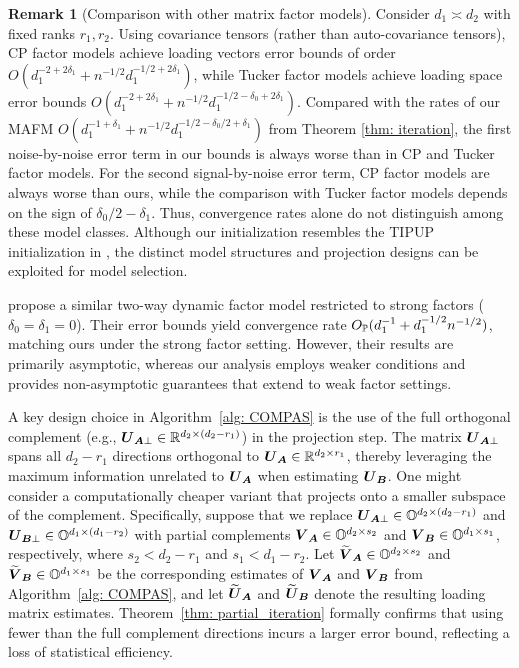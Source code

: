 \documentclass[11pt,letterpaper]{article}
\theoremstyle{definition}
\newtheorem{remark}{Remark}
\newcommand{\cano}[1]{\widetilde{\mathbf{#1}}}
\begin{document}
\begin{remark}[Comparison with other matrix factor models] \label{rmk:comparison}
Consider $d_1\asymp d_2$ with fixed ranks $r_1,r_2$. Using covariance tensors (rather than auto-covariance tensors), CP factor models \citep{han2024cp,chen2026estimation} achieve loading vectors error bounds of order $O(d_1^{-2+2\delta_1}+n^{-1/2}d_1^{-1/2+2\delta_1})$, while Tucker factor models \citep{han2024tensor} achieve loading space error bounds $O(d_1^{-2+2\delta_1}+n^{-1/2}d_1^{-1/2-\delta_0+2\delta_1})$. Compared with the rates of our MAFM $O(d_1^{-1+\delta_1}+n^{-1/2}d_1^{-1/2-\delta_0/2+\delta_1})$ from Theorem \ref{thm: iteration}, the first noise-by-noise error term in our bounds is always worse than in CP and Tucker factor models. For the second signal-by-noise error term, CP factor models are always worse than ours, while the comparison with Tucker factor models depends on the sign of $\delta_0/2-\delta_1$. Thus, convergence rates alone do not distinguish among these model classes. Although our initialization resembles the TIPUP initialization in \cite{chen2022factor, han2024tensor}, the distinct model structures and projection designs can be exploited for model selection.

\cite{yuan2023twoway} propose a similar two-way dynamic factor model restricted to strong factors ($\delta_0=\delta_1=0$). Their error bounds yield convergence rate $O_{\mathbb{P}}(d_1^{-1}+d_1^{-1/2} n^{-1/2})$, matching ours under the strong factor setting. However, their results are primarily asymptotic, whereas our analysis employs weaker conditions and provides non-asymptotic guarantees that extend to weak factor settings.



\end{remark}




A key design choice in Algorithm~\ref{alg: COMPAS} is the use of the full orthogonal complement (e.g., $\boldsymbol{U}_{\boldsymbol{A}\perp} \in \mathbb{R}^{d_2 \times (d_2-r_1)}$) in the projection step. The matrix $\boldsymbol{U}_{\boldsymbol{A}\perp}$ spans all $d_2-r_1$ directions orthogonal to $\boldsymbol{U}_{\boldsymbol{A}} \in \mathbb{R}^{d_2 \times r_1}$, thereby leveraging the maximum information unrelated to $\boldsymbol{U}_{\boldsymbol{A}}$ when estimating $\boldsymbol{U}_{\boldsymbol{B}}$. One might consider a computationally cheaper variant that projects onto a smaller subspace of the complement. Specifically, suppose that we replace $\boldsymbol{U}_{\boldsymbol{A}\perp} \in \mathbb{O}^{d_2 \times (d_2-r_1)}$ and $\boldsymbol{U}_{\boldsymbol{B}\perp} \in \mathbb{O}^{d_1 \times (d_1-r_2)}$ with partial complements $\boldsymbol{V}_{\boldsymbol{A}} \in \mathbb{O}^{d_2 \times s_2}$ and $\boldsymbol{V}_{\boldsymbol{B}} \in \mathbb{O}^{d_1 \times s_1}$, respectively, where $s_2<d_2-r_1$ and $s_1<d_1-r_2$. Let $\cano \bV_{\bA} \in \OO^{d_2 \times s_2}$ and $\cano \bV_{\bB} \in \OO^{d_1 \times s_1}$ be the corresponding estimates of $\boldsymbol{V}_{\boldsymbol{A}}$ and $\boldsymbol{V}_{\boldsymbol{B}}$ from Algorithm~\ref{alg: COMPAS}, and let $\cano \bU_{\bA}$ and $\cano \bU_{\bB}$ denote the resulting loading matrix estimates. 
Theorem~\ref{thm: partial_iteration} formally confirms that using fewer than the full complement directions incurs a larger error bound, reflecting a loss of statistical efficiency.
\end{document}
